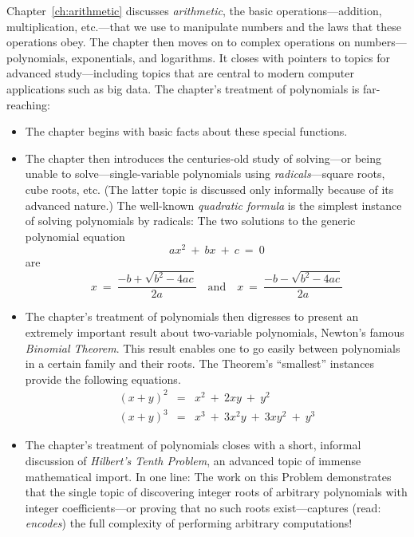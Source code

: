 Chapter~\ref{ch:arithmetic} discusses {\it arithmetic}, the basic operations---addition, multiplication, etc.---that we use to manipulate numbers and the laws that these operations obey.  The chapter then moves on to complex operations on numbers---polynomials, exponentials, and logarithms.  It closes with pointers to topics for advanced study---including topics that are central to modern computer applications such as big data.  The chapter's treatment of polynomials is 
far-reaching:
\begin{itemize}
\item
The chapter begins with basic facts about these special functions.
\medskip\item
The chapter then introduces the centuries-old study of solving---or being unable to solve---single-variable polynomials using {\em radicals}---square roots, cube roots, etc.  (The latter topic is discussed only informally because of its advanced nature.)  The well-known {\it quadratic formula} is the simplest instance of solving polynomials by radicals: The two solutions to the generic polynomial equation
\[ ax^2 \ + \ bx \ + \ c \ = \ 0 \]
are
\[ x \ = \ \frac{-b + \sqrt{b^2 - 4ac}}{2a}
 \ \ \ \mbox{ and } \ \ \
   x \ = \ \frac{-b - \sqrt{b^2 - 4ac}}{2a}
\]

 

\medskip\item
The chapter's treatment of polynomials then digresses to present an extremely important result about two-variable polynomials, Newton's famous {\it Binomial Theorem}.  This result enables one to go easily between polynomials in a certain family and their roots.  The Theorem's ``smallest'' instances provide the following equations.
\begin{eqnarray*}
(x + y)^2 & = & x^2 \ + \ 2xy \ + \ y^2 \\
(x + y)^3 & = & x^3 \ + \ 3x^2y \ + \ 3 xy^2 \ + \ y^3
\end{eqnarray*}
\medskip\item
The chapter's treatment of polynomials closes with a short, informal discussion of {\it Hilbert's Tenth Problem}, an advanced topic of immense mathematical import.  In one line: The work on this Problem demonstrates that the single topic of discovering integer roots of arbitrary polynomials with integer coefficients---or proving that no such roots exist---captures (read: {\em encodes}) the full complexity of performing arbitrary computations!
\end{itemize}

